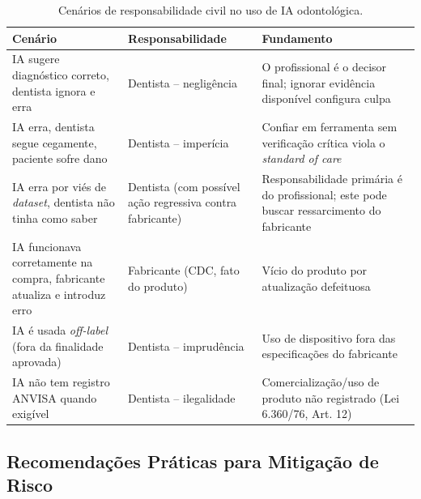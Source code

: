 \begin{table}[H]
  \centering
  \caption{Cenários de responsabilidade civil no uso de IA odontológica.}
  \label{tab:cenarios-responsabilidade}
  \begin{tabularx}{\textwidth}{p{3cm}XX}
    \toprule
    \textbf{Cenário} & \textbf{Responsabilidade} & \textbf{Fundamento} \\
    \midrule
    IA sugere diagnóstico correto, dentista ignora e erra &
      Dentista -- negligência &
      O profissional é o decisor final; ignorar evidência disponível
      configura culpa \\
    IA erra, dentista segue cegamente, paciente sofre dano &
      Dentista -- imperícia &
      Confiar em ferramenta sem verificação crítica viola o
      \textit{standard of care} \\
    IA erra por viés de \textit{dataset}, dentista não tinha como saber &
      Dentista (com possível ação regressiva contra fabricante) &
      Responsabilidade primária é do profissional; este pode buscar
      ressarcimento do fabricante \\
    IA funcionava corretamente na compra, fabricante atualiza e introduz erro &
      Fabricante (CDC, fato do produto) &
      Vício do produto por atualização defeituosa \\
    IA é usada \textit{off-label} (fora da finalidade aprovada) &
      Dentista -- imprudência &
      Uso de dispositivo fora das especificações do fabricante \\
    IA não tem registro ANVISA quando exigível &
      Dentista -- ilegalidade &
      Comercialização/uso de produto não registrado (Lei 6.360/76, Art. 12) \\
    \bottomrule
  \end{tabularx}
\end{table}

\subsection{Recomendações Práticas para Mitigação de Risco}

